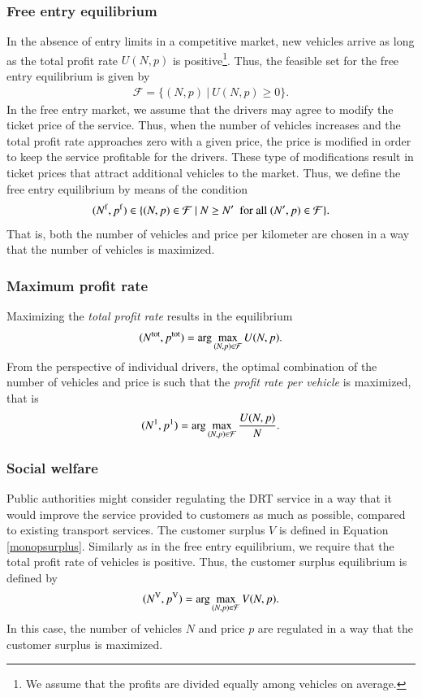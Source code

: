 \documentclass[dissertation,draft*]{aaltoseries}
\begin{document}
\subsubsection{Free entry equilibrium}
In the absence of entry limits in a competitive market, new vehicles arrive as long as 
the total profit rate $U(N,p)$ is positive\footnote{We assume that the profits are 
divided equally among vehicles on average.}. 
Thus, the feasible set for the free entry equilibrium is given by
\begin{align}
\mathcal{F} = \{(N,p) \ | \ U(N,p) \geq 0 \}.
\end{align}
In the free entry market, we assume that the drivers may agree to modify the ticket price of the service.
Thus, when the number of vehicles increases and the total profit rate approaches zero with a given 
price, the price is modified in order to keep the service profitable for the drivers.
These type of modifications result in ticket prices that attract additional vehicles to the market.
Thus, we define the free entry equilibrium by means of the condition
\begin{align}
\label{freeentry}
(N^{\rm f},p^{\rm f}) \in \{ (N,p) \in \mathcal{F} \ | \ N \geq N' \ \mbox{ for all } (N',p) \in \mathcal{F} \}.
\end{align}
That is, both the number of vehicles and price per kilometer are chosen in a way that the 
number of vehicles is maximized.

\subsubsection{Maximum profit rate}
Maximizing the \emph{total profit rate} results in the equilibrium
\begin{align}
\label{totalprofit}
(N^{\rm tot},p^{\rm tot}) = \arg \max_{(N,p) \in \mathcal{F}} U(N,p). 
\end{align}
From the perspective of individual drivers, the optimal combination of the
number of vehicles and price is such that the \emph{profit rate per vehicle}
is maximized, that is 
\begin{align}
\label{pervehicle}
(N^{\rm 1},p^{\rm 1}) = \arg \max_{(N,p) \in \mathcal{F}} \frac{U(N,p)}{N}. 
\end{align}
 
\subsubsection{Social welfare}
Public authorities might consider regulating the DRT service in a way that it would
improve the service provided to customers as much as possible, compared
to existing transport services. The customer surplus $V$ is defined in Equation \eqref{monopsurplus}.
Similarly as in the free entry equilibrium, we require that the total profit rate of
vehicles is positive. Thus, the customer surplus equilibrium is defined by 
\begin{align}
\label{surplus}
(N^{\rm V},p^{\rm V}) = \arg \max_{(N,p) \in \mathcal{F}} V(N,p). 
\end{align}
In this case, the number of vehicles $N$ and price $p$ are regulated in a way that the 
customer surplus is maximized.
\end{document}
